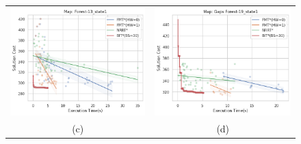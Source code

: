 \documentclass{article}
\begin{document}
\begin{figure}[H]
{\begin{tabular}{cc}
			\includegraphics[scale=0.45]{scVet_Forest-13_state1.png} & \includegraphics[scale=0.45]{scVet_Gaps Forest-19_state1.png}    \\
			(c) & (d) \\[6pt]

\end{tabular}}
\end{figure}
\end{document}
